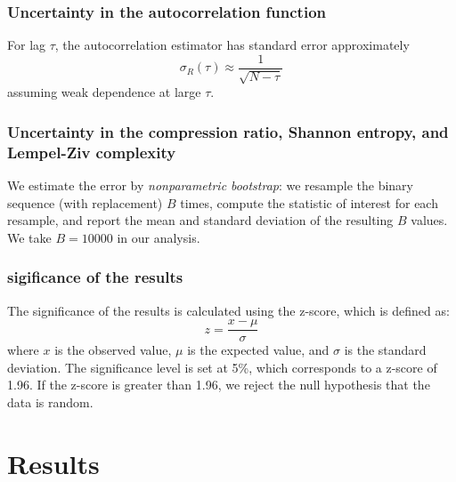 \subsubsection{Uncertainty in the autocorrelation function}
For lag \(\tau\), the autocorrelation estimator has standard error approximately
\begin{equation}
\sigma_{R}(\tau) \approx \frac{1}{\sqrt{N-\tau}}
\end{equation}
assuming weak dependence at large $\tau$.

\subsubsection{Uncertainty in the compression ratio, Shannon entropy, and Lempel-Ziv complexity}
We estimate the error by \textit{nonparametric bootstrap}: we resample the binary sequence (with replacement) $B$ times, compute the statistic of interest for each resample, and report the mean and standard deviation of the resulting $B$ values. We take $B=10000$ in our analysis.

\subsubsection{sigificance of the results}
The significance of the results is calculated using the z-score, which is defined as:
\begin{equation}
z = \frac{x - \mu}{\sigma}
\end{equation}
where $x$ is the observed value, $\mu$ is the expected value, and $\sigma$ is the standard deviation. The significance level is set at 5\%, which corresponds to a z-score of 1.96. If the z-score is greater than 1.96, we reject the null hypothesis that the data is random. 

\section{Results}
